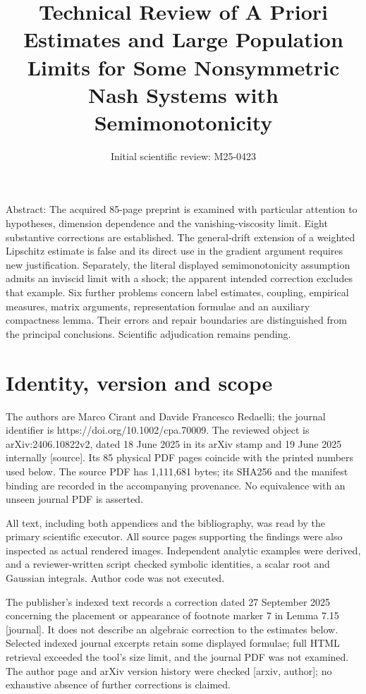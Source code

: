 \documentclass[10pt]{article}
\title{Technical Review of A Priori Estimates and Large Population Limits for Some Nonsymmetric Nash Systems with Semimonotonicity}
\author{Initial scientific review: M25-0423}
\date{}
\begin{document}
\maketitle
Abstract: The acquired 85-page preprint is examined with particular attention to hypotheses, dimension dependence and the vanishing-viscosity limit. Eight substantive corrections are established. The general-drift extension of a weighted Lipschitz estimate is false and its direct use in the gradient argument requires new justification. Separately, the literal displayed semimonotonicity assumption admits an inviscid limit with a shock; the apparent intended correction excludes that example. Six further problems concern label estimates, coupling, empirical measures, matrix arguments, representation formulae and an auxiliary compactness lemma. Their errors and repair boundaries are distinguished from the principal conclusions. Scientific adjudication remains pending.\par
\section*{Identity, version and scope}
The authors are Marco Cirant and Davide Francesco Redaelli; the journal identifier is https://doi.org/10.1002/cpa.70009. The reviewed object is arXiv:2406.10822v2, dated 18 June 2025 in its arXiv stamp and 19 June 2025 internally [source]. Its 85 physical PDF pages coincide with the printed numbers used below. The source PDF has 1,111,681 bytes; its SHA256 and the manifest binding are recorded in the accompanying provenance. No equivalence with an unseen journal PDF is asserted.\par
All text, including both appendices and the bibliography, was read by the primary scientific executor. All source pages supporting the findings were also inspected as actual rendered images. Independent analytic examples were derived, and a reviewer-written script checked symbolic identities, a scalar root and Gaussian integrals. Author code was not executed.\par
The publisher’s indexed text records a correction dated 27 September 2025 concerning the placement or appearance of footnote marker 7 in Lemma 7.15 [journal]. It does not describe an algebraic correction to the estimates below. Selected indexed journal excerpts retain some displayed formulae; full HTML retrieval exceeded the tool’s size limit, and the journal PDF was not examined. The author page and arXiv version history were checked [arxiv, author]; no exhaustive absence of further corrections is claimed.\par
\end{document}
